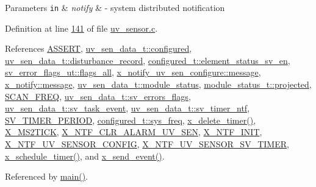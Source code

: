\begin{DoxyParams}[1]{Parameters}
\mbox{\tt in}  & {\em notify} & -\/ system distributed notification \\
\hline
\end{DoxyParams}


Definition at line \hyperlink{a00073_source_l00141}{141} of file \hyperlink{a00073_source}{uv\+\_\+sensor.\+c}.



References \hyperlink{a00072_source_l00059}{A\+S\+S\+E\+R\+T}, \hyperlink{a00035_source_l00044}{uv\+\_\+sen\+\_\+data\+\_\+t\+::configured}, \hyperlink{a00035_source_l00049}{uv\+\_\+sen\+\_\+data\+\_\+t\+::disturbance\+\_\+record}, \hyperlink{a00021_source_l00205}{configured\+\_\+t\+::element\+\_\+status\+\_\+sv\+\_\+en}, \hyperlink{a00022_source_l00044}{sv\+\_\+error\+\_\+flags\+\_\+ut\+::flags\+\_\+all}, \hyperlink{a00020_a1497b20cf78cad9e85b8ed48a9aa7bd2}{x\+\_\+notify\+\_\+uv\+\_\+sen\+\_\+configure\+::message}, \hyperlink{a00036_source_l00075}{x\+\_\+notify\+::message}, \hyperlink{a00035_source_l00053}{uv\+\_\+sen\+\_\+data\+\_\+t\+::module\+\_\+status}, \hyperlink{a00017_a6b2516d74583418cec324c50041421c9}{module\+\_\+status\+\_\+t\+::projected}, \hyperlink{a00021_source_l00096}{S\+C\+A\+N\+\_\+\+F\+R\+E\+Q}, \hyperlink{a00035_source_l00059}{uv\+\_\+sen\+\_\+data\+\_\+t\+::sv\+\_\+errors\+\_\+flags}, \hyperlink{a00035_source_l00037}{uv\+\_\+sen\+\_\+data\+\_\+t\+::sv\+\_\+task\+\_\+event}, \hyperlink{a00035_source_l00040}{uv\+\_\+sen\+\_\+data\+\_\+t\+::sv\+\_\+timer\+\_\+ntf}, \hyperlink{a00023_source_l00020}{S\+V\+\_\+\+T\+I\+M\+E\+R\+\_\+\+P\+E\+R\+I\+O\+D}, \hyperlink{a00021_source_l00192}{configured\+\_\+t\+::sys\+\_\+freq}, \hyperlink{a00037_source_l00482}{x\+\_\+delete\+\_\+timer()}, \hyperlink{a00036_source_l00048}{X\+\_\+\+M\+S2\+T\+I\+C\+K}, \hyperlink{a00021_source_l00174}{X\+\_\+\+N\+T\+F\+\_\+\+C\+L\+R\+\_\+\+A\+L\+A\+R\+M\+\_\+\+U\+V\+\_\+\+S\+E\+N}, \hyperlink{a00036_source_l00030}{X\+\_\+\+N\+T\+F\+\_\+\+I\+N\+I\+T}, \hyperlink{a00020_source_l00012}{X\+\_\+\+N\+T\+F\+\_\+\+U\+V\+\_\+\+S\+E\+N\+S\+O\+R\+\_\+\+C\+O\+N\+F\+I\+G}, \hyperlink{a00035_source_l00016}{X\+\_\+\+N\+T\+F\+\_\+\+U\+V\+\_\+\+S\+E\+N\+S\+O\+R\+\_\+\+S\+V\+\_\+\+T\+I\+M\+E\+R}, \hyperlink{a00037_source_l00456}{x\+\_\+schedule\+\_\+timer()}, and \hyperlink{a00037_source_l00381}{x\+\_\+send\+\_\+event()}.



Referenced by \hyperlink{a00048_source_l00080}{main()}.


